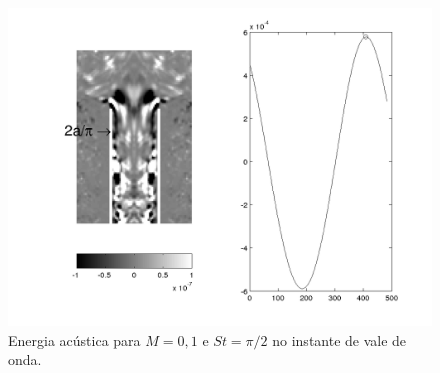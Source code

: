 \newpage
\begin{figure}[ht!]
\centering
  \includegraphics[width=1.\linewidth]{figuras/max_01_3.png}
  \caption[Energia acústica para $M = 0,1$ e $St = \pi/2$ no instante de vale de onda.]{Energia acústica para $M = 0,1$ e $St = \pi/2$ no instante de vale de onda.}
  \label{fig:max_01_3}
\end{figure}


